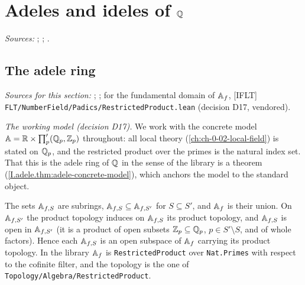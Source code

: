 
\chapter{\texorpdfstring{Adeles and ideles of $\mathbb{Q}$}{Adeles and ideles of ℚ}}\label{ch:ch-0-03-adeles}

\noindent\emph{Sources:} \cite{Corv-ptIII-1}; \cite{GH}; \cite[§2]{AIntro}.

\section{The adele ring}\label{sec:adele-ring}

\noindent\emph{Sources for this section:} \cite[§§1.3--1.4, 1.7]{GH}; \cite[§§3.1--3.2]{Corv-ptIII-1}; for the
fundamental domain of $\mathbb{A}_f$, [IFLT] \texttt{FLT/NumberField/Padics/RestrictedProduct.lean} (decision D17, vendored).

\emph{The working model (decision D17).} We work with the concrete model $\mathbb{A}=\mathbb{R}\times\prod'_p(\mathbb{Q}_p,\mathbb{Z}_p)$ throughout:
all local theory (\cref{ch:ch-0-02-local-field}) is stated on $\mathbb{Q}_p$, and the restricted product over the primes is the
natural index set. That this is the adele ring of $\mathbb{Q}$ in the sense of the library is a theorem
(\cref{I.adele.thm:adele-concrete-model}), which anchors the model to the standard object.

\begin{definition}
\end{definition}
\noindent The sets $\mathbb{A}_{f,S}$ are subrings, $\mathbb{A}_{f,S}\subseteq\mathbb{A}_{f,S'}$ for $S\subseteq S'$, and $\mathbb{A}_f$ is their
union. On $\mathbb{A}_{f,S'}$ the product topology induces on $\mathbb{A}_{f,S}$ its product topology, and $\mathbb{A}_{f,S}$ is open in
$\mathbb{A}_{f,S'}$ (it is a product of open subsets $\mathbb{Z}_p\subseteq\mathbb{Q}_p$, $p\in S'\setminus S$, and of whole factors). Hence each
$\mathbb{A}_{f,S}$ is an open subspace of $\mathbb{A}_f$ carrying its product topology. In the library $\mathbb{A}_f$ is
\texttt{RestrictedProduct} over \texttt{Nat.Primes} with respect to the cofinite filter, and the topology is the one
of \texttt{Topology/\allowbreak Algebra/\allowbreak RestrictedProduct}.

